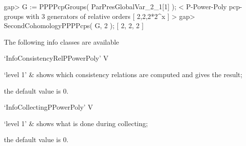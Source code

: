 \beginexample
gap> G := PPPPcpGroups( ParPresGlobalVar_2_1[1] );
< P-Power-Poly pcp-groups with 3 generators of relative orders [ 2,2,2*2^x ] >
gap> SecondCohomologyPPPPcps( G, 2 );
[ 2, 2, 2 ]
\endexample


The following info classes are available

\>`InfoConsistencyRelPPowerPoly' V

\beginitems
`level 1' & shows which consistency relations are computed and gives the 
result;
\enditems

the default value is 0.

\>`InfoCollectingPPowerPoly' V

\beginitems
`level 1' & shows what is done during collecting;
\enditems

the default value is 0.
